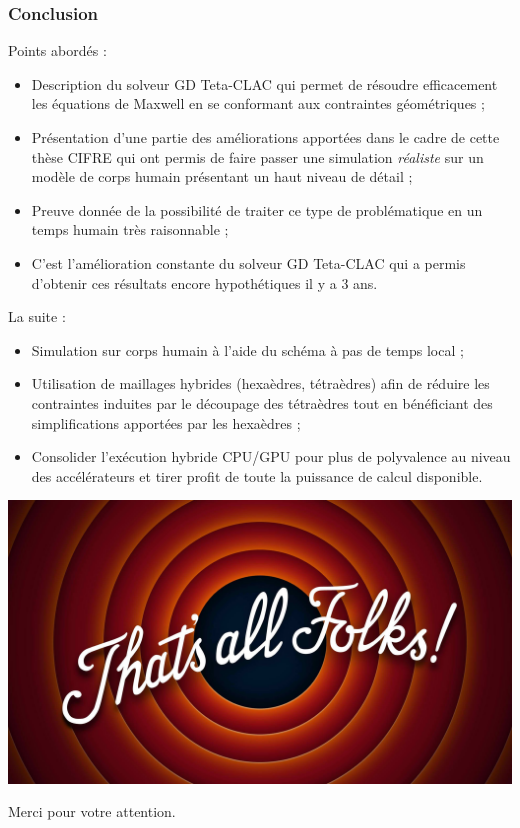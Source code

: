 \documentclass[
	10pt,
]{beamer}
\begin{document}
\begin{frame}
\frametitle{Conclusion}
\vfill
Points abordés :
\begin{itemize}
\item Description du solveur GD Teta-CLAC qui permet de résoudre efficacement les équations de Maxwell en se conformant aux contraintes géométriques ;
\item Présentation d'une partie des améliorations apportées dans le cadre de cette thèse CIFRE qui ont permis de faire passer une simulation \textit{réaliste} sur un modèle de corps humain présentant un haut niveau de détail ;
\item Preuve donnée de la possibilité de traiter ce type de problématique en un temps humain très raisonnable ;
\item C'est l'amélioration constante du solveur GD Teta-CLAC qui a permis d'obtenir ces résultats encore hypothétiques il y a $3$ ans.
\end{itemize}
\vfill
La suite :
\begin{itemize}
\item Simulation sur corps humain à l'aide du schéma à pas de temps local ;
\item Utilisation de maillages hybrides (hexaèdres, tétraèdres) afin de réduire les contraintes induites par le découpage des tétraèdres tout en bénéficiant des simplifications apportées par les hexaèdres ;
\item Consolider l'exécution hybride CPU/GPU pour plus de polyvalence au niveau des accélérateurs et tirer profit de toute la puissance de calcul disponible.
\end{itemize}
\end{frame}






\begin{frame}
\includegraphics[width=\textwidth]{../img/fin}

\vfill
 
\huge{\centerline{Merci pour votre attention.}}
\end{frame}
\end{document}
